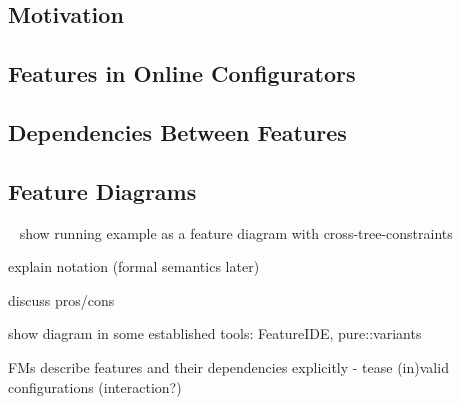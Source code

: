 
\subsection{Motivation}


\subsection{Features in Online Configurators}

\subsection{Dependencies Between Features}








\subsection{Feature Diagrams} %

\begin{frame}{~}
show running example as a feature diagram with cross-tree-constraints

explain notation (formal semantics later)

discuss pros/cons

show diagram in some established tools: FeatureIDE, pure::variants

FMs describe features and their dependencies explicitly - tease (in)valid configurations (interaction?)
\end{frame}

%

